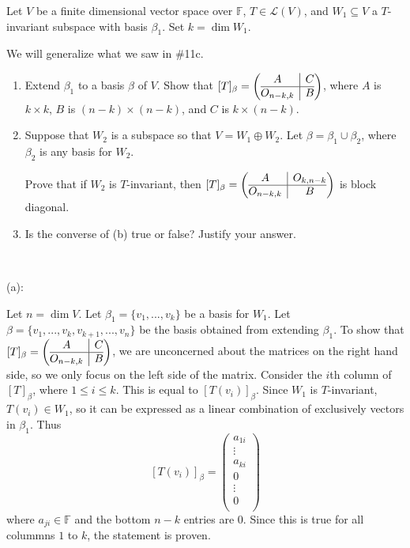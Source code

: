 \documentclass{eh-homework}
\begin{document}
    \begin{question}{12}
        Let \( V \) be a finite dimensional vector space over \( \mathbb{F} \), \( T \in \mathcal{L}(V) \), and \( W_1 \subseteq V \) a \( T \)-invariant subspace with basis \( \beta_1 \). Set \( k = \dim W_1 \).

        We will generalize what we saw in \#11c.

        \begin{enumerate}[label=(\alph*)]
            \item Extend \( \beta_1 \) to a basis \( \beta \) of \( V \). Show that \( [T]_\beta = \left(\begin{array}{@{}c|c@{}} A & C \\ \hline O_{n-k,k} & B \end{array} \right)\), where \( A \) is \( k \times k \), \( B \) is \( (n-k) \times (n-k) \), and \( C \) is \( k \times (n-k) \).
            \item Suppose that \( W_2 \) is a subspace so that \( V = W_1 \oplus W_2 \). Let \( \beta = \beta_1 \cup \beta_2 \), where \( \beta_2 \) is any basis for \( W_2 \).

            Prove that if \( W_2 \) is \( T \)-invariant, then \( [T]_\beta = \left(\begin{array}{@{}c|c@{}} A & O_{k,n-k} \\ \hline O_{n-k,k} & B \end{array}\right) \) is block diagonal.
            \item Is the converse of (b) true or false? Justify your answer.
        \end{enumerate}
        \tcblower
        \ 

        (a):

        Let \(n = \dim V\). Let \(\beta _1 = \{ v_1, ..., v_k \}\) be a basis for \(W_1\). Let \(\beta = \{ v_1, ..., v_k, v_{k+1} , ..., v_n \}\) be the basis obtained from extending \(\beta _1\). To show that \([T]_\beta = \left(\begin{array}{@{}c|c@{}} A & C \\ \hline O_{n-k,k} & B \end{array} \right)\), we are unconcerned about the matrices on the right hand side, so we only focus on the left side of the matrix. Consider the \(i\)th column of \([T]_\beta\), where \(1 \leq i \leq k\). This is equal to \([T(v_i)]_\beta\). Since \(W_1\) is \(T\)-invariant, \(T(v_i) \in W_1\), so it can be expressed as a linear combination of exclusively vectors in \(\beta _1\). Thus
        \[
            [T(v_i)]_\beta = \begin{pmatrix}
                 a_{1i} \\
                 \vdots \\
                 a_{ki} \\
                 0 \\
                 \vdots \\
                 0 \\
            \end{pmatrix}
        \]
        where \(a_{ji} \in \mathbb{F}\) and the bottom \(n-k\) entries are 0. Since this is true for all colummns \(1\) to \(k\), the statement is proven.


\end{question}
\end{document}
